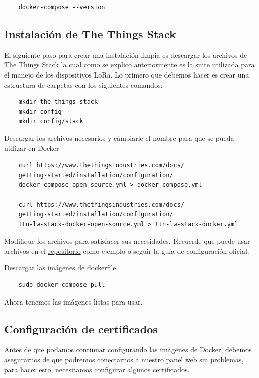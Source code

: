 \begin{lstlisting}
    docker-compose --version
\end{lstlisting}

\subsection{Instalación de The Things Stack}

El siguiente paso para crear una instalación limpia es descargar los archivos de The Things Stack la
cual como se explico anteriormente es la suite utilizada para el manejo de los dispositivos LoRa. Lo
primero que debemos hacer es crear una estructura de carpetas con los siguientes comandos:

\begin{lstlisting}
    mkdir the-things-stack
    mkdir config
    mkdir config/stack
\end{lstlisting}

Descargar los archivos necesarios y cámbiarle el nombre para que se pueda utilizar en Docker

\begin{lstlisting}
    curl https://www.thethingsindustries.com/docs/
    getting-started/installation/configuration/
    docker-compose-open-source.yml > docker-compose.yml
    
    curl https://www.thethingsindustries.com/docs/
    getting-started/installation/configuration/
    ttn-lw-stack-docker-open-source.yml > ttn-lw-stack-docker.yml
\end{lstlisting}

Modifique los archivos para satisfacer sus necesidades. Recuerde que puede usar archivos en el
\href{https://github.com/francofonseca/lorawan_gateway}{repositorio} como ejemplo o seguir la guía
de configuración oficial.

Descargar las imágenes de dockerfile

\begin{lstlisting}
    sudo docker-compose pull
\end{lstlisting}

Ahora tenemos las imágenes listas para usar.

\subsection{Configuración de certificados}

Antes de que podamos continuar configurando las imágenes de Docker, debemos asegurarnos de que
podremos conectarnos a nuestro panel web sin problemas, para hacer esto, necesitamos configurar
algunos certificados.

